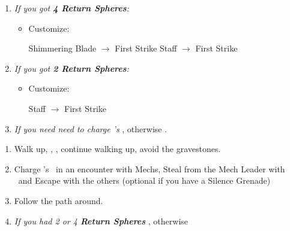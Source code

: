 \begin{enumerate}[resume]
    \item \textit{If you got \textbf{4 Return Spheres}:}
        \begin{itemize}
            \item Customize:
                \begin{itemize}
                    \auronf Shimmering Blade $\rightarrow$ First Strike
                    \yunaf Staff $\rightarrow$ First Strike
                \end{itemize}
        \end{itemize}
    \item \textit{If you got \textbf{2 Return Spheres}:}
        \begin{itemize}
            \item Customize:
            \begin{itemize}
                \yunaf Staff $\rightarrow$ First Strike
            \end{itemize}
        \end{itemize}
    \bothvfill
    \winvfill
    \lossvfill
    \item \textit{If you need need to charge \rikku's \od} \formation{\tidus}{\rikku}{\auron}, otherwise \formation{\tidus}{\kimahri}{\wakka}.
\end{enumerate}
\begin{enumerate}[resume]
    \item Walk up, \sd, \cs[1:20], continue walking up, avoid the gravestones.
    \item Charge \rikku's \od\ in an encounter with Mechs, Steal from the Mech Leader with \rikku\ and Escape with the others (optional if you have a Silence Grenade)
    \item Follow the path around.
    \item \textit{If you had 2 or 4 \textbf{Return Spheres}} \formation{\tidus}{\yuna}{\auron}, otherwise \formation{\tidus}{\kimahri}{\wakka}
\end{enumerate}
